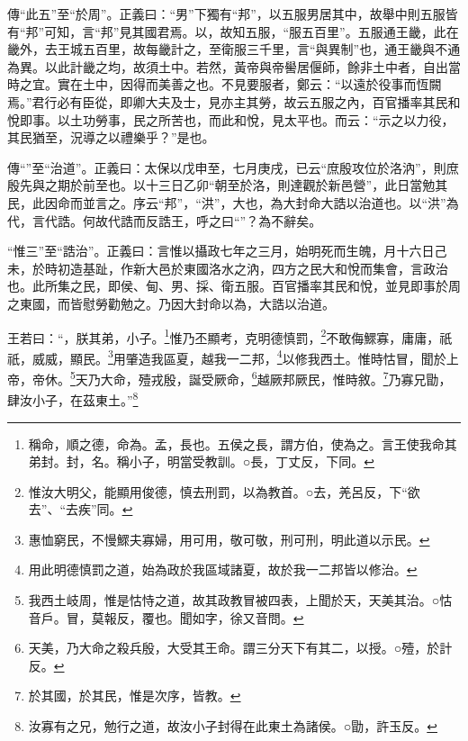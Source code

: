 {\noindent\zhuan{}\fzbyks 傳“此五”至“於周”。正義曰：“男”下獨有“邦”，以五服男居其中，故舉中則五服皆有“邦”可知，言“邦”見其國君焉。以，故知五服，“服五百里”。五服通王畿，此在畿外，去王城五百里，故每畿計之，至衛服三千里，言“與異制”也，通王畿與不通為異。以此計畿之均，故須土中。若然，黃帝與帝嚳居偃師，餘非土中者，自出當時之宜。實在土中，因得而美善之也。不見要服者，鄭云：“以遠於役事而恆闕焉。”君行必有臣從，即卿大夫及士，見亦主其勞，故云五服之內，百官播率其民和悅即事。以土功勞事，民之所苦也，而此和悅，見太平也。而云：“示之以力役，其民猶至，況導之以禮樂乎？”是也。 \par}

{\noindent\zhuan{}\fzbyks 傳“”至“治道”。正義曰：太保以戊申至，七月庚戌，已云“庶殷攻位於洛汭”，則庶殷先與之期於前至也。以十三日乙卯“朝至於洛，則達觀於新邑營”，此日當勉其民，此因命而並言之。序云“邦”，“洪”，大也，為大封命大誥以治道也。以“洪”為代，言代誥。何故代誥而反誥王，呼之曰“”？為不辭矣。 \par}

{\noindent\shu{}\fzkt “惟三”至“誥治”。正義曰：言惟以攝政七年之三月，始明死而生魄，月十六日己未，於時初造基趾，作新大邑於東國洛水之汭，四方之民大和悅而集會，言政治也。此所集之民，即侯、甸、男、採、衛五服。百官播率其民和悅，並見即事於周之東國，而皆慰勞勸勉之。乃因大封命以為，大誥以治道。 \par}

王若曰：“，朕其弟，小子。\footnote{稱命，順之德，命為。孟，長也。五侯之長，謂方伯，使為之。言王使我命其弟封。封，名。稱小子，明當受教訓。○長，丁丈反，下同。}惟乃丕顯考，克明德慎罰，\footnote{惟汝大明父，能顯用俊德，慎去刑罰，以為教首。○去，羌呂反，下“欲去”、“去疾”同。}不敢侮鰥寡，庸庸，祇祇，威威，顯民。\footnote{惠恤窮民，不慢鰥夫寡婦，用可用，敬可敬，刑可刑，明此道以示民。}用肇造我區夏，越我一二邦，\footnote{用此明德慎罰之道，始為政於我區域諸夏，故於我一二邦皆以修治。}以修我西土。惟時怙冒，聞於上帝，帝休。\footnote{我西土岐周，惟是怙恃之道，故其政教冒被四表，上聞於天，天美其治。○怙音戶。冒，莫報反，覆也。聞如字，徐又音問。}天乃大命，殪戎殷，誕受厥命，\footnote{天美，乃大命之殺兵殷，大受其王命。謂三分天下有其二，以授。○殪，於計反。}越厥邦厥民，惟時敘。\footnote{於其國，於其民，惟是次序，皆教。}乃寡兄勖，肆汝小子，在茲東土。”\footnote{汝寡有之兄，勉行之道，故汝小子封得在此東土為諸侯。○勖，許玉反。}



